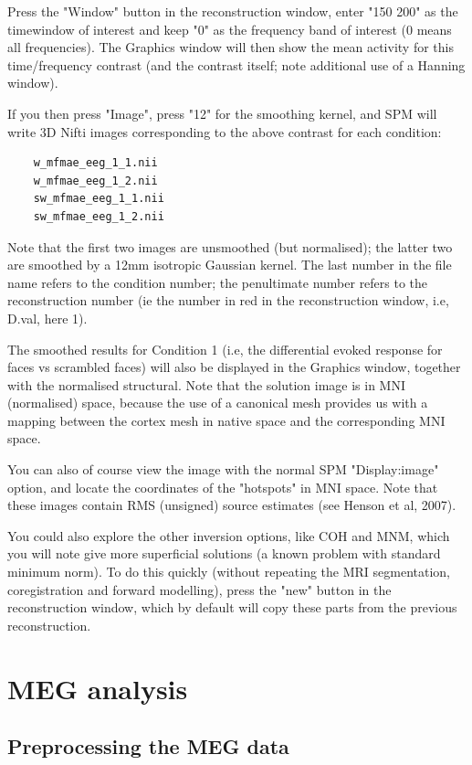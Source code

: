 \noindent * Press the "Window" button in the reconstruction window, enter "150 200" as the timewindow of interest and keep "0" as the frequency band of interest (0 means all frequencies). The Graphics window will then show the mean activity for this time/frequency contrast (and the contrast itself; note additional use of a Hanning window).

\noindent * If you then press "Image", press "12" for the smoothing kernel, and SPM will write 3D Nifti images corresponding to the above contrast for each condition:
\begin{verbatim}
    w_mfmae_eeg_1_1.nii
    w_mfmae_eeg_1_2.nii
    sw_mfmae_eeg_1_1.nii
    sw_mfmae_eeg_1_2.nii
\end{verbatim}
Note that the first two images are unsmoothed (but normalised); the latter two are smoothed by a 12mm isotropic Gaussian kernel. The last number in the file name refers to the condition number; the penultimate number refers to the reconstruction number (ie the number in red in the reconstruction window, i.e, D.val, here 1).

The smoothed results for Condition 1 (i.e, the differential evoked response for faces vs scrambled faces) will also be displayed in the Graphics window, together with the normalised structural. Note that the solution image is in MNI (normalised) space, because the use of a canonical mesh provides us with a mapping between the cortex mesh in native space and the corresponding MNI space.

You can also of course view the image with the normal SPM "Display:image" option, and locate the coordinates of the "hotspots" in MNI space. Note that these images contain RMS (unsigned) source estimates (see Henson et al, 2007).

You could also explore the other inversion options, like COH and MNM, which you will note give more superficial solutions (a known problem with standard minimum norm). To do this quickly (without repeating the MRI segmentation, coregistration and forward modelling), press the "new" button in the reconstruction window, which by default will copy these parts from the previous reconstruction.


\section{MEG analysis}

\subsection{Preprocessing the MEG data}

